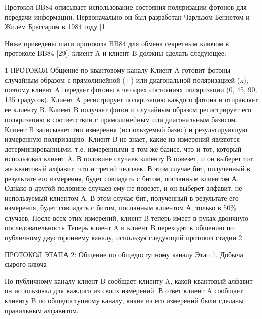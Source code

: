 Протокол BB84 описывает использование состояния поляризации фотонов для передачи информации. Первоначально он был разработан Чарльзом Беннетом и Жилем Брассаром в 1984 году [1].

Ниже приведены шаги протокола BB84 для обмена секретным ключом в протоколе BB84 [29], клиент A и клиент B должны сделать следующее:

1 ПРОТОКОЛ Общение по квантовому каналу
Клиент A готовит фотоны случайным образом с прямолинейной (+) или диагональной поляризацией (x), поэтому клиент A передает фотоны в четырех состояниях поляризации (0, 45, 90, 135 градусов).
Клиент A регистрирует поляризацию каждого фотона и отправляет ее клиенту B.
Клиент B получает фотон и случайным образом регистрирует его поляризацию в соответствии с прямолинейным или диагональным базисом. Клиент B записывает тип измерения (используемый базис) и результирующую измеренную поляризацию.
Клиент B не знает, какие из измерений являются детерминированными, т.е. измеренными в том же базисе, что и тот, который использовал клиент A. В половине случаев клиенту B повезет, и он выберет тот же квантовый алфавит, что и третий человек. В этом случае бит, полученный в результате его измерения, будет совпадать с битом, посланным клиентом А. Однако в другой половине случаев ему не повезет, и он выберет алфавит, не используемый клиентом А. В этом случае бит, полученный в результате его измерения, будет совпадать с битом, посланным клиентом А, только в 50\% случаев. После всех этих измерений, клиент B теперь имеет в руках двоичную последовательность 
Теперь клиент A и клиент B переходят к общению по публичному двустороннему каналу, используя следующий протокол стадии 2.

ПРОТОКОЛ ЭТАПА 2: Общение по общедоступному каналу
Этап 1. Добыча сырого ключа

По публичному каналу клиент B сообщает клиенту A, какой квантовый алфавит он использовал для каждого из своих измерений.
В ответ клиент A сообщает клиенту B по общедоступному каналу, какие из его измерений были сделаны правильным алфавитом.

